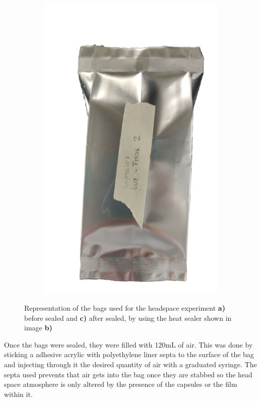 \begin{refsection}
\begin{figure}[h]
\begin{subfigure}[b]{0.3\linewidth}
        \caption{ }
        \label{fig:sealer}
    \end{subfigure}
    \begin{subfigure}[b]{0.3\linewidth}
        \centering
        \includegraphics[width=0.8\linewidth]{Documento_Latex/Tesis 2/Imagenes/Sealed_Bag.png}
        \caption{ }
        \label{fig:sealed_bag}
    \end{subfigure}
    \caption{Representation of the bags used for the headspace experiment \textbf{a)} before sealed and \textbf{c)} after sealed,  by using the heat sealer shown in image \textbf{b)}}
    \label{fig:bags}
\end{figure}

Once the bags were sealed, they were filled with 120mL of air. This was done by sticking a adhesive acrylic with polyethylene liner septa to the surface of the bag and injecting through it the desired quantity of air with a graduated syringe. The septa used prevents that air gets into the bag once they are stabbed so the head space atmosphere is only altered by the presence of the capsules or the film within it.


\end{refsection}
